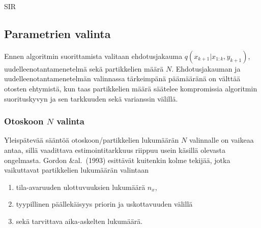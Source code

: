 \documentclass[
  12pt,
  a4paper, twoside]{book}
\providecommand{\tightlist}{%
  \setlength{\itemsep}{0pt}\setlength{\parskip}{0pt}}
\begin{document}
\begin{algorithm}[H]
\label{sir}
\DontPrintSemicolon
\SetAlgoShortEnd
{}
\caption{SIR}
\end{algorithm}

\subsection{Parametrien valinta}

Ennen algoritmin suorittamista valitaan ehdotusjakauma \(q(x_{k+1}|x_{1:k},y_{k+1})\), uudelleenotantamenetelmä sekä partikkelien määrä \(N\). Ehdotusjakauman ja uudelleenotantamenetelmän valinnassa tärkeimpänä päämääränä on välttää otosten ehtymistä, kun taas partikkelien määrä säätelee kompromissia algoritmin suorituskyvyn ja sen tarkkuuden sekä varianssin välillä.

\subsubsection{Otoskoon $N$ valinta}

Yleispätevää sääntöä otoskoon/partikkelien lukumäärän \(N\) valinnalle on vaikeaa antaa, sillä vaadittava estimointitarkkuus riippuu usein käsillä olevasta ongelmasta. Gordon \&al.~(1993) \citep{Gordon-1993} esittävät kuitenkin kolme tekijää, jotka vaikuttavat partikkelien lukumäärän valintaan

\begin{enumerate}
\def\labelenumi{\alph{enumi}.}
\tightlist
\item
  tila-avaruuden ulottuvuuksien lukumäärä \({n_x}\),
\item
  tyypillinen päällekäisyys priorin ja uskottavuuden välillä
\item
  sekä tarvittava aika-askelten lukumäärä.
\end{enumerate}
\end{document}

